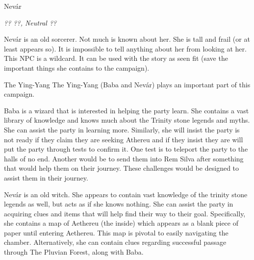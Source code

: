 \begin{monsterbox}{Nev\'{a}r}
	\begin{hangingpar}
		\textit{?? ??, Neutral ??}
	\end{hangingpar}
	\dndline%
	\basics[%
	armorclass = ??,
	hitpoints  = ??,
	speed      = ?? ft
	]
	\dndline%
	\stats[
	STR = \stat{}, %
	DEX = \stat{},
	CON = \stat{},
	INT = \stat{},
	WIS = \stat{},
	CHA = \stat{}
	]
	\dndline%
	\details[%
	languages = {Common},
	challenge = 20
	]
	\dndline%
	Nev\'{a}r is an old sorcerer. Not much is known about her. She is tall and frail (or at least appears so). It is impossible to tell anything about her from looking at her. This NPC is a wildcard. It can be used with the story as seen fit (save the important things she contains to the campaign).
\end{monsterbox}

\begin{commentbox}{The Ying-Yang}
	The Ying-Yang (Baba and Nev\'{a}r) plays an important part of this campaign. 
	
	Baba is a wizard that is interested in helping the party learn. She contains a vast library of knowledge and knows much about the Trinity stone legends and myths. She can assist the party in learning more. Similarly, she will insist the party is not ready if they claim they are seeking Athereu and if they insist they are will put the party through tests to confirm it. One test is to teleport the party to the halls of no end. Another would be to send them into Rem Silva after something that would help them on their journey. These challenges would be designed to assist them in their journey. 
	
	Nev\'{a}r is an old witch. She appears to contain vast knowledge of the trinity stone legends as well, but acts as if she knows nothing. She can assist the party in acquiring clues and items that will help find their way to their goal. Specifically, she contains a map of Aethereu (the inside) which appears as a blank piece of paper until entering Aethereu. This map is pivotal to easily navigating the chamber. Alternatively, she can contain clues regarding successful passage through The Pluvian Forest, along with Baba.
\end{commentbox}

